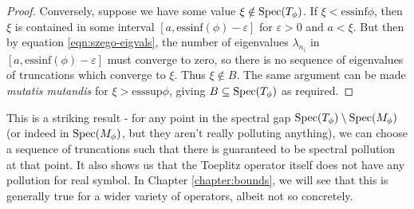 \documentclass[../main.tex]{subfiles}
\begin{document}
\begin{proof}
Conversely, suppose we have some value $\xi \notin \mathrm{Spec}(T_\phi)$. If $\xi <
\mathrm{essinf}\phi$, then $\xi$ is contained in some interval $[a,
\mathrm{essinf}(\phi) - \varepsilon]$ for $\varepsilon > 0$ and $a < \xi$. But
then by equation \ref{eqn:szego-eigvals}, the number of eigenvalues
$\lambda_{n_i}$ in $[a, \mathrm{essinf}(\phi) - \varepsilon]$ must converge to
zero, so there is no sequence of eigenvalues of truncations which converge to
$\xi$. Thus $\xi \notin B$. The same argument can be made \emph{mutatis
mutandis} for $\xi > \mathrm{esssup}\phi$, giving $B \subseteq \mathrm{Spec}(T_\phi)$ as
required.
\end{proof}

This is a striking result - for any point in the spectral gap $\mathrm{Spec}(T_\phi)
\setminus \mathrm{Spec}(M_\phi)$ (or indeed in $\mathrm{Spec}(M_\phi)$, but they aren't really
polluting anything), we can choose a sequence of truncations such that there is
guaranteed to be spectral pollution at that point. It also shows us that the
Toeplitz operator itself does not have any pollution for real symbol.
In Chapter \ref{chapter:bounds}, we will see that this is generally true for
a wider variety of operators, albeit not so concretely.
\end{document}
